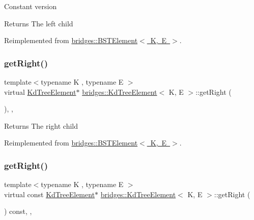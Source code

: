 Constant version

\begin{DoxyReturn}{Returns}
The left child 
\end{DoxyReturn}


Reimplemented from \mbox{\hyperlink{classbridges_1_1_b_s_t_element_a2abcfb991f6cc377da2bd9217319fc9c}{bridges\+::\+B\+S\+T\+Element$<$ K, E $>$}}.

\mbox{\label{classbridges_1_1_kd_tree_element_a8e1090891a720231c2009d1d222471e9}} 
\subsubsection{\texorpdfstring{get\+Right()}{getRight()}\hspace{0.1cm}{\footnotesize\ttfamily [1/2]}}
{\footnotesize\ttfamily template$<$typename K , typename E $>$ \\
virtual \mbox{\hyperlink{classbridges_1_1_kd_tree_element}{Kd\+Tree\+Element}}$\ast$ \mbox{\hyperlink{classbridges_1_1_kd_tree_element}{bridges\+::\+Kd\+Tree\+Element}}$<$ K, E $>$\+::get\+Right (\begin{DoxyParamCaption}{ }\end{DoxyParamCaption})\hspace{0.3cm}{\ttfamily [inline]}, {\ttfamily [override]}, {\ttfamily [virtual]}}

\begin{DoxyReturn}{Returns}
The right child 
\end{DoxyReturn}


Reimplemented from \mbox{\hyperlink{classbridges_1_1_b_s_t_element_a35e93bce32de933522dccde5f2b5ffd9}{bridges\+::\+B\+S\+T\+Element$<$ K, E $>$}}.

\mbox{\label{classbridges_1_1_kd_tree_element_a48e6a81eccf6d156e50865ef8066be82}} 
\subsubsection{\texorpdfstring{get\+Right()}{getRight()}\hspace{0.1cm}{\footnotesize\ttfamily [2/2]}}
{\footnotesize\ttfamily template$<$typename K , typename E $>$ \\
virtual const \mbox{\hyperlink{classbridges_1_1_kd_tree_element}{Kd\+Tree\+Element}}$\ast$ \mbox{\hyperlink{classbridges_1_1_kd_tree_element}{bridges\+::\+Kd\+Tree\+Element}}$<$ K, E $>$\+::get\+Right (\begin{DoxyParamCaption}{ }\end{DoxyParamCaption}) const\hspace{0.3cm}{\ttfamily [inline]}, {\ttfamily [override]}, {\ttfamily [virtual]}}

